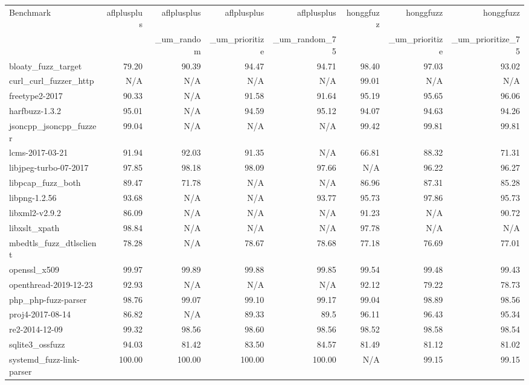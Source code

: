 \begin{table}
  {\scriptsize
      \begin{tabular}{l|r|r|r|r|r|r|r}
        Benchmark & aflplusplus & aflplusplus & aflplusplus & aflplusplus & honggfuzz & honggfuzz & honggfuzz \\
        & & \_um\_random & \_um\_prioritize &  \_um\_random\_75 & & \_um\_prioritize & \_um\_prioritize\_75 \\
        \hline
        \hline
bloaty\_fuzz\_target & 79.20 & 90.39 & 94.47 & 94.71 & 98.40 & 97.03 & 93.02 \\
curl\_curl\_fuzzer\_http & N/A & N/A & N/A & N/A & 99.01 & N/A & N/A \\
freetype2-2017 & 90.33 & N/A & 91.58 & 91.64 & 95.19 & 95.65 & 96.06 \\
harfbuzz-1.3.2 & 95.01 & N/A & 94.59 & 95.12 & 94.07 & 94.63 & 94.26 \\
jsoncpp\_jsoncpp\_fuzzer & 99.04 & N/A & N/A & N/A & 99.42 & 99.81 & 99.81 \\
lcms-2017-03-21 & 91.94 & 92.03 & 91.35 & N/A & 66.81 & 88.32 & 71.31 \\
libjpeg-turbo-07-2017 & 97.85 & 98.18 & 98.09 & 97.66 & N/A & 96.22 & 96.27 \\
libpcap\_fuzz\_both & 89.47 & 71.78 & N/A & N/A & 86.96 & 87.31 & 85.28 \\
libpng-1.2.56 & 93.68 & N/A & N/A & 93.77 & 95.73 & 97.86 & 95.73 \\
libxml2-v2.9.2 & 86.09 & N/A & N/A & N/A & 91.23 & N/A & 90.72 \\
libxslt\_xpath & 98.84 & N/A & N/A & N/A & 97.78 & N/A & N/A \\
mbedtls\_fuzz\_dtlsclient & 78.28 & N/A & 78.67 & 78.68 & 77.18 & 76.69 & 77.01 \\
openssl\_x509 & 99.97 & 99.89 & 99.88 & 99.85 & 99.54 & 99.48 & 99.43 \\
openthread-2019-12-23 & 92.93 & N/A & N/A & N/A & 92.12 & 79.22 & 78.73 \\
php\_php-fuzz-parser & 98.76 & 99.07 & 99.10 & 99.17 & 99.04 & 98.89 & 98.56 \\
proj4-2017-08-14 & 86.82 & N/A & 89.33 & 89.5 & 96.11 & 96.43 & 95.34 \\
re2-2014-12-09 & 99.32 & 98.56 & 98.60 & 98.56 & 98.52 & 98.58 & 98.54 \\
sqlite3\_ossfuzz & 94.03 & 81.42 & 83.50 & 84.57 & 81.49 & 81.12 & 81.02 \\
systemd\_fuzz-link-parser & 100.00 & 100.00 & 100.00 & 100.00 & N/A & 99.15 & 99.15 \\

\end{tabular}}
\end{table}
